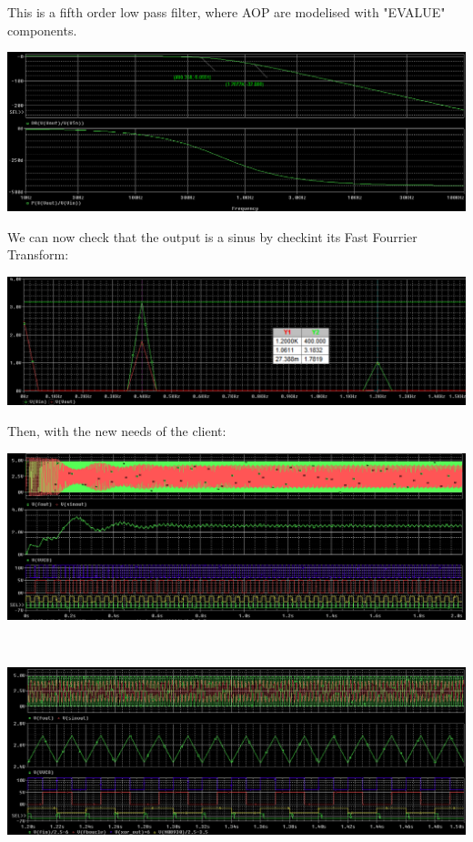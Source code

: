 \documentclass{article}
\begin{document}
This is a fifth order low pass filter, where AOP are modelised with "EVALUE" components.

\includegraphics[width=15cm]{bode_filtre_sortie.png}

We can now check that the output is a sinus by checkint its Fast Fourrier Transform:

\includegraphics[width=15cm]{fft_filtre_sortie.png}


Then, with the new needs of the client:

\includegraphics[width=15cm]{pll_2_zoom_full.png}

~

\includegraphics[width=15cm]{pll_2_zoom1.png}
\end{document}
